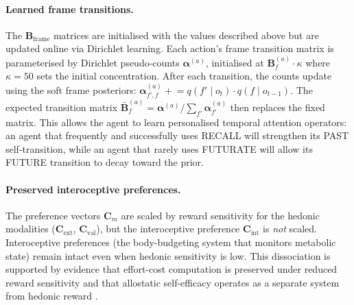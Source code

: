 \documentclass[11pt,a4paper]{article}
\begin{document}
\paragraph{Learned frame transitions.} The $\mathbf{B}_{\text{frame}}$ matrices are initialised with the values described above but are updated online via Dirichlet learning. Each action's frame transition matrix is parameterised by Dirichlet pseudo-counts $\boldsymbol{\alpha}^{(a)}$, initialised at $\mathbf{B}_f^{(a)} \cdot \kappa$ where $\kappa = 50$ sets the initial concentration. After each transition, the counts update using the soft frame posteriors: $\boldsymbol{\alpha}^{(a)}_{f', f} \mathrel{+}= q(f' \mid o_t) \cdot q(f \mid o_{t-1})$. The expected transition matrix $\bar{\mathbf{B}}_f^{(a)} = \boldsymbol{\alpha}^{(a)} / \sum_{f'} \boldsymbol{\alpha}^{(a)}_{f'}$ then replaces the fixed matrix. This allows the agent to learn personalised temporal attention operators: an agent that frequently and successfully uses RECALL will strengthen its PAST self-transition, while an agent that rarely uses FUTURATE will allow its FUTURE transition to decay toward the prior.

\paragraph{Preserved interoceptive preferences.} The preference vectors $\mathbf{C}_m$ are scaled by reward sensitivity for the hedonic modalities ($\mathbf{C}_{\text{ext}}$, $\mathbf{C}_{\text{val}}$), but the interoceptive preference $\mathbf{C}_{\text{int}}$ is \emph{not} scaled. Interoceptive preferences (the body-budgeting system that monitors metabolic state) remain intact even when hedonic sensitivity is low. This dissociation is supported by evidence that effort-cost computation is preserved under reduced reward sensitivity \citep{treadway2012effort} and that allostatic self-efficacy operates as a separate system from hedonic reward \citep{stephan2016allostatic}.
\end{document}
